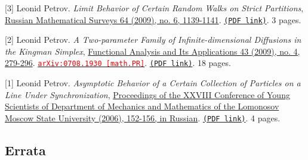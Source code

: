 \begin{etaremune}
\item[{[3]}] 
Leonid Petrov.
\emph{Limit Behavior of Certain Random Walks on Strict Partitions}, \href{}{Russian Mathematical Surveys 64 (2009), no. 6, 1139-1141}. 
 \href{https://storage.lpetrov.cc/papers/03-limit_behavior_of.pdf}{\texttt{(PDF link)}}. 3 pages.



\item[{[2]}] 
Leonid Petrov.
\emph{A Two-parameter Family of Infinite-dimensional Diffusions in the Kingman Simplex}, \href{}{Functional Analysis and Its Applications 43 (2009), no. 4, 279-296}. 
\href{https://arxiv.org/abs/0708.1930}{\texttt{{\textcolor{red}{arXiv:0708.1930 [math.PR]}}}}. \href{https://storage.lpetrov.cc/papers/02-a_twoparameter_family.pdf}{\texttt{(PDF link)}}. 18 pages.



\item[{[1]}] 
Leonid Petrov.
\emph{Asymptotic Behavior of a Certain Collection of Particles on a Line Under Synchronization}, \href{}{Proceedings of the XXVIII Conference of Young Scientists of Department of Mechanics and Mathematics of the Lomonosov Moscow State University (2006), 152-156, in Russian}. 
 \href{https://storage.lpetrov.cc/papers/01-asymptotic_behavior_of.pdf}{\texttt{(PDF link)}}. 4 pages.


\end{etaremune}

\subsection*{Errata}

